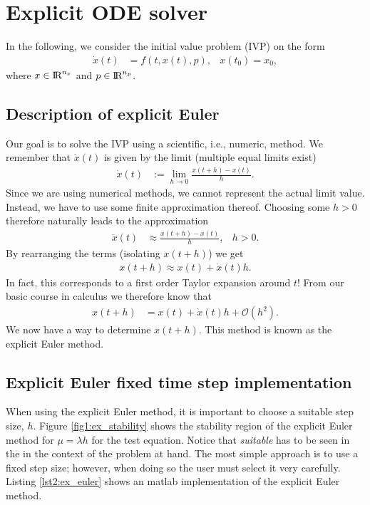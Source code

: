 \chapter{Explicit ODE solver}
In the following, we consider the initial value problem (IVP) on the form
\begin{align}
    \dot{x}(t) &= f(t,x(t),p), & x(t_0) = x_0,
\end{align}
where $x \in \text{I\kern-0.15em R} ^{n_x}$ and $p \in \text{I\kern-0.15em R} ^{n_p}$. 

\section{Description of explicit Euler}
Our goal is to solve the IVP using a scientific, i.e., numeric, method. We remember that $\dot{x}(t)$ is given by the limit (multiple equal limits exist)
\begin{align}
    \dot{x}(t) &:= \lim_{h \rightarrow 0} \frac{x(t+h)-x(t)}{h}.
\end{align}
Since we are using numerical methods, we cannot represent the actual limit value. Instead, we have to use some finite approximation thereof. Choosing some $h>0$ therefore naturally leads to the approximation
\begin{align}
    \dot{x}(t) &\approx \frac{x(t+h)-x(t)}{h}, &h>0.
\end{align}
By rearranging the terms (isolating $x(t+h)$) we get
\begin{align}
    x(t+h) \approx x(t) + \dot{x}(t) h.
\end{align}
In fact, this corresponds to a first order Taylor expansion around $t$! From our basic course in calculus we therefore know that
\begin{align}
    x(t+h) &= x(t) + \dot{x}(t) h + \mathcal{O}(h^2).
    \label{eq2:ex_euler}
\end{align}
We now have a way to determine $x(t+h)$. This method is known as the explicit Euler method. 

\section{Explicit Euler fixed time step implementation}
When using the explicit Euler method, it is important to choose a suitable step size, $h$. Figure \ref{fig1:ex_stability} shows the stability region of the explicit Euler method for $\mu = \lambda h$ for the test equation. Notice that \textit{suitable} has to be seen in the in the context of the problem at hand. The most simple approach is to use a fixed step size; however, when doing so the user must select it very carefully. Listing \ref{lst2:ex_euler} shows an matlab implementation of the explicit Euler method.

